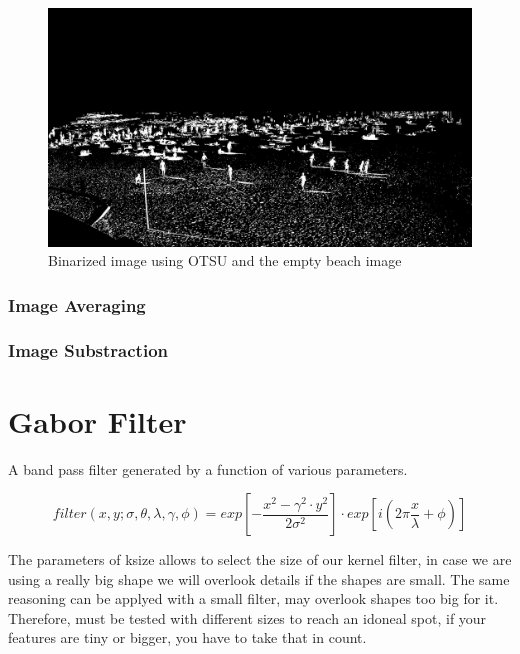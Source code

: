 \documentclass[10pt]{article}
\begin{document}
\begin{figure}[h]
    \centering
    \includegraphics[width=\textwidth]{img/OTSU_sub_arena.jpg}
    \caption{Binarized image using OTSU and the empty beach image}
    \label{fig:y equals x}
\end{figure}

\subsubsection{Image Averaging}



\subsubsection{Image Substraction}


\section{Gabor Filter}



A band pass filter generated by a function of various parameters.

\begin{equation}
    filter(x,y;\sigma,\theta,\lambda,\gamma,\phi) = exp [ - \frac{x^2 - \gamma ^2 \cdot y^2}{2 \sigma^2} ] \cdot exp [ i (2 \pi \frac{x}{\lambda} + \phi) ] 
\end{equation}


The parameters of ksize allows to select the size of our kernel filter, in case we are using a really big shape we will overlook details if the shapes are small. The same reasoning can be applyed with a small filter, may overlook shapes too big for it. Therefore, must be tested with different sizes to reach an idoneal spot, if your features are tiny or bigger, you have to take that in count.
\end{document}
